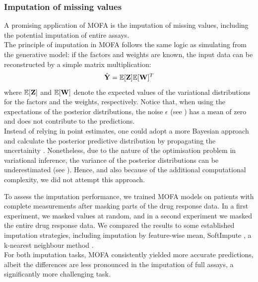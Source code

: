 \subsubsection{Imputation of missing values}

A promising application of MOFA is the imputation of missing values, including the potential imputation of entire assays.\\
The principle of imputation in MOFA follows the same logic as simulating from the generative model: if the factors and weights are known, the input data can be reconstructed by a simple matrix multiplication:
\[
	\hat{{\bf Y}} = \mathbb{E}[{\bf Z}] \mathbb{E}[{\bf W}]^T
\]
where $\mathbb{E}[{\bf Z}]$ and $\mathbb{E}[{\bf W}]$ denote the expected values of the variational distributions for the factors and the weights, respectively. Notice that, when using the expectations of the posterior distributions, the noise $\epsilon$ (see ) has a mean of zero and does not contribute to the predictions.\\
Instead of relying in point estimates, one could adopt a more Bayesian approach and calculate the posterior predictive distribution by propagating the uncertainity \cite{Gelman2013}. Nonetheless, due to the nature of the optimisation problem in variational inference, the variance of the posterior distributions can be underestimated (see ). Hence, and also because of the additional computational complexity, we did not attempt this approach.

To assess the imputation performance, we trained MOFA models on patients with complete measurements after masking parts of the drug response data. In a first experiment, we masked values at random, and in a second experiment we masked the entire drug response data. We compared the results to some established imputation strategies, including imputation by feature-wise mean, SoftImpute \cite{Mazumder2010}, a k-nearest neighbour method \cite{Troyanskaya2001}.\\
For both imputation tasks, MOFA consistently yielded more accurate predictions, albeit the differences are less pronounced in the imputation of full assays, a significantly more challenging task.

